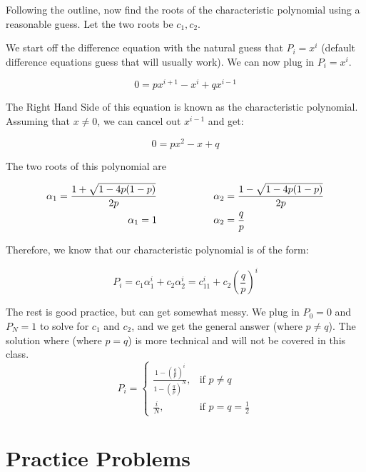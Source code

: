 \documentclass[11pt]{article}
\begin{document}
\begin{description}
Following the outline, now find the roots of the characteristic polynomial using a reasonable guess. Let the two roots be $c_1,c_2$.
\begin{solution}
We start off the difference equation with the natural guess that $P_i = x^i$ (default difference equations guess that will usually work). We can now plug in $P_i = x^i$.

\[0 = px^{i+1} - x^i + qx^{i-1}\]

The Right Hand Side of this equation is known as the characteristic polynomial. Assuming that $x \neq 0$, we can cancel out $x^{i-1}$ and get:

\[0 = px^2 - x + q\]

The two roots of this polynomial are

\begin{align*}
\alpha_1 = \frac{1 + \sqrt{1 - 4p(1-p)}}{2p} \hskip 1cm & \hskip 1cm \alpha_2 =  \frac{1 - \sqrt{1 - 4p(1-p)}}{2p} \\
\alpha_1 = 1 \hskip 1cm & \hskip 1cm \alpha_2 =  \frac{q}{p}
\end{align*}
\end{solution}

Therefore, we know that our characteristic polynomial is of the form:

\[P_i = c_1\alpha_1^i + c_2\alpha_2^i = c_11^i + c_2\left(\frac{q}{p}\right)^i\]

The rest is good practice, but can get somewhat messy. We plug in $P_0 = 0$ and $P_N = 1$ to solve for $c_1$ and $c_2$, and we get the general answer (where $p\neq q$). The solution where (where $p = q$) is more technical and will not be covered in this class.\\

$$
P_i =
\begin{cases}
\frac{1 - \left(\frac{q}{p}\right)^i}{1 - \left(\frac{q}{p}\right)^N}, & \text{if }p \neq q \\
\frac{i}{N}, & \text{if } p = q = \frac{1}{2}
\end{cases}
$$


\pagebreak

\end{description}

\section*{Practice Problems}
\end{document}

